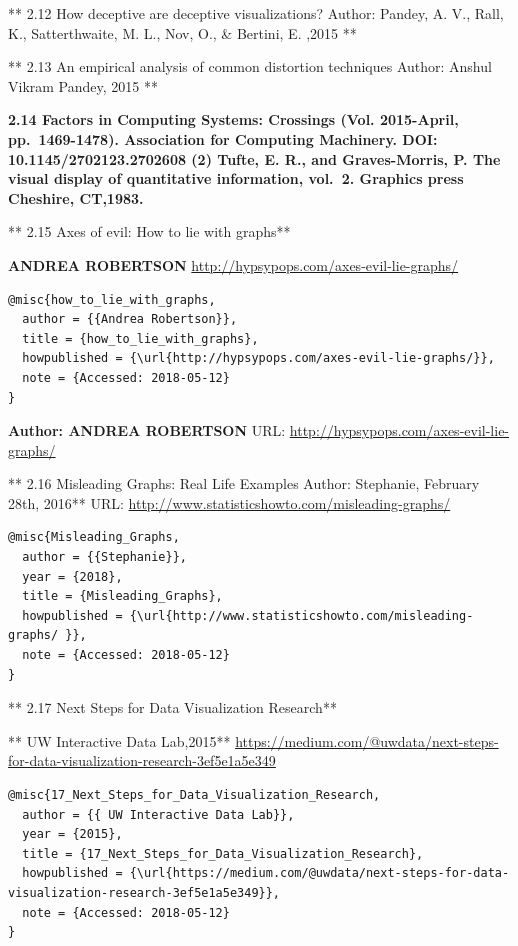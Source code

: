 \documentclass[]{book}
\theoremstyle{definition}
\theoremstyle{definition}
\theoremstyle{definition}
\theoremstyle{remark}
\begin{document}
** 2.12 How deceptive are deceptive visualizations?\textbf{ } Author:
Pandey, A. V., Rall, K., Satterthwaite, M. L., Nov, O., \& Bertini, E.
,2015 **

** 2.13 An empirical analysis of common distortion techniques\textbf{ }
Author: Anshul Vikram Pandey, 2015 **

\textbf{2.14 Factors in Computing Systems: Crossings (Vol. 2015-April,
pp.~1469-1478). Association for Computing Machinery. DOI:
10.1145/2702123.2702608 (2) Tufte, E. R., and Graves-Morris, P. The
visual display of quantitative information, vol.~2. Graphics press
Cheshire, CT,1983.}

** 2.15 Axes of evil: How to lie with graphs**

\textbf{ANDREA ROBERTSON}
\url{http://hypsypops.com/axes-evil-lie-graphs/}
\citep{how_to_lie_with_graphs}

\begin{verbatim}
@misc{how_to_lie_with_graphs,
  author = {{Andrea Robertson}},
  title = {how_to_lie_with_graphs},
  howpublished = {\url{http://hypsypops.com/axes-evil-lie-graphs/}},
  note = {Accessed: 2018-05-12}
}
\end{verbatim}

\textbf{Author: ANDREA ROBERTSON} URL:
\url{http://hypsypops.com/axes-evil-lie-graphs/}

** 2.16 Misleading Graphs: Real Life Examples\textbf{ }Author:
Stephanie, February 28th, 2016** URL:
\url{http://www.statisticshowto.com/misleading-graphs/}

\citep{Misleading_Graphs}

\begin{verbatim}
@misc{Misleading_Graphs,
  author = {{Stephanie}},
  year = {2018},
  title = {Misleading_Graphs},
  howpublished = {\url{http://www.statisticshowto.com/misleading-graphs/ }},
  note = {Accessed: 2018-05-12}
}
\end{verbatim}

** 2.17 Next Steps for Data Visualization Research**

** UW Interactive Data Lab,2015**
\url{https://medium.com/@uwdata/next-steps-for-data-visualization-research-3ef5e1a5e349}
\citep{17_Next_Steps_for_Data_Visualization_Research}

\begin{verbatim}
@misc{17_Next_Steps_for_Data_Visualization_Research,
  author = {{ UW Interactive Data Lab}},
  year = {2015},
  title = {17_Next_Steps_for_Data_Visualization_Research},
  howpublished = {\url{https://medium.com/@uwdata/next-steps-for-data-visualization-research-3ef5e1a5e349}},
  note = {Accessed: 2018-05-12}
}
\end{verbatim}
\end{document}
